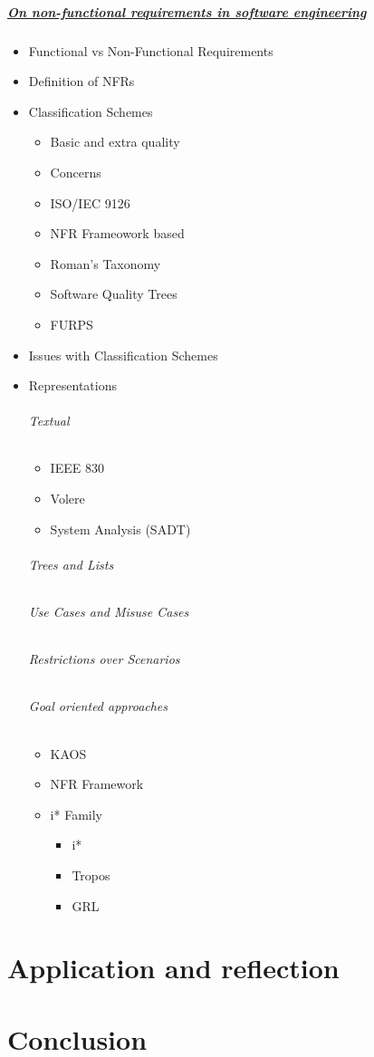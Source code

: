 \documentclass[dissertation]{softeng}
\begin{document}
\paragraph*{\underline{On non-functional requirements in software engineering}}\cite{Chung:2009vg}
\begin{itemize}
\item Functional vs Non-Functional Requirements
\item Definition of NFRs
\item{Classification Schemes}
\begin{itemize}
\item Basic and extra quality
\item Concerns
\item ISO/IEC 9126
\item NFR Frameowork based
\item Roman's Taxonomy
\item Software Quality Trees
\item FURPS
\end{itemize}
\item Issues with Classification Schemes
\item{Representations}
\subparagraph{Textual}
\begin{itemize}
\item IEEE 830
\item Volere
\item System Analysis (SADT)
\end{itemize}
\subparagraph{Trees and Lists}
\subparagraph{Use Cases and Misuse Cases}
\subparagraph{Restrictions over Scenarios}
\subparagraph{Goal oriented approaches}
\begin{itemize}
\item KAOS
\item NFR Framework
\item{i* Family}
\begin{itemize}
\item i*
\item Tropos
\item GRL
\end{itemize}
\end{itemize}
\end{itemize}
\pagebreak

\chapter{Application and reflection}

\chapter{Conclusion}
\end{document}
